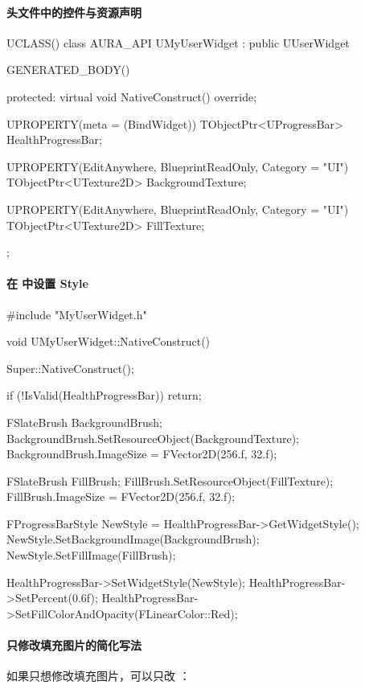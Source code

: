 \paragraph{头文件中的控件与资源声明}

\begin{code}
	UCLASS()
	class AURA_API UMyUserWidget : public UUserWidget
	{
		GENERATED_BODY()
		
		protected:
		virtual void NativeConstruct() override;
		
		UPROPERTY(meta = (BindWidget))
		TObjectPtr<UProgressBar> HealthProgressBar;
		
		UPROPERTY(EditAnywhere, BlueprintReadOnly, Category = "UI")
		TObjectPtr<UTexture2D> BackgroundTexture;
		
		UPROPERTY(EditAnywhere, BlueprintReadOnly, Category = "UI")
		TObjectPtr<UTexture2D> FillTexture;
	};
\end{code}

\paragraph{在  中设置 Style}

\begin{code}
	#include "MyUserWidget.h"
	
	void UMyUserWidget::NativeConstruct()
	{
		Super::NativeConstruct();
		
		if (!IsValid(HealthProgressBar))
		{
			return;
		}
		
		FSlateBrush BackgroundBrush;
		BackgroundBrush.SetResourceObject(BackgroundTexture);
		BackgroundBrush.ImageSize = FVector2D(256.f, 32.f);
		
		FSlateBrush FillBrush;
		FillBrush.SetResourceObject(FillTexture);
		FillBrush.ImageSize = FVector2D(256.f, 32.f);
		
		FProgressBarStyle NewStyle = HealthProgressBar->GetWidgetStyle();
		NewStyle.SetBackgroundImage(BackgroundBrush);
		NewStyle.SetFillImage(FillBrush);
		
		HealthProgressBar->SetWidgetStyle(NewStyle);
		HealthProgressBar->SetPercent(0.6f);
		HealthProgressBar->SetFillColorAndOpacity(FLinearColor::Red);
	}
\end{code}

\paragraph{只修改填充图片的简化写法}

如果只想修改填充图片，可以只改 ：

